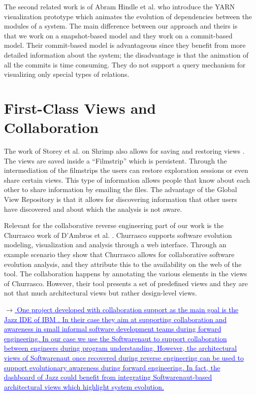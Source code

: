 \documentclass[preprint,12pt]{elsarticle}
\newcommand{\ra}{$\rightarrow$}
\newcommand{\chg}[2]{\textcolor{red}{\sout{#1}}{\ra}\textcolor{blue}{\uline{#2}}} %
\begin{document}
The second related work is of Abram Hindle et al. \cite{hindle-yarn} who introduce the YARN visualization prototype which animates the evolution of dependencies between the modules of a system. The main difference between our approach and theirs is that we work on a snapshot-based model and they work on a commit-based model. Their commit-based model is advantageous since they benefit from more detailed information about the system; the disadvantage is that the animation of all the commits is time consuming. They do not support a query mechanism for visualizing only special types of relations.


\section {First-Class Views and Collaboration} 

The work of Storey et al. on Shrimp also allows for saving and restoring views \cite{rayside-flow}. The views are saved inside a ``Filmstrip'' which is persistent. Through the intermediation of the filmstrips the users can restore exploration sessions or even share certain views. This type of information allows people that know about each other to share information by emailing the files. The advantage of the Global View Repository is that it allows for discovering information that other users have discovered and about which the analysis is not aware. 


Relevant for the collaborative reverse engineering part of our work is the Churrasco work of D’Ambros et al. \cite{dambros-churrasco}. Churrasco supports software evolution modeling, visualization and analysis through a web interface. 
Through an example scenario they show that Churrasco allows for collaborative software evolution analysis, and they attribute this to the availability on the web of the tool. The collaboration happens by annotating the various elements in the views of Churrasco. However, their tool presents a set of predefined views and they are not that much architectural views but rather design-level views. 

\chg{}{
One project developed with collaboration support as the main goal is the Jazz IDE of IBM \cite{hupfer-jazz}. 
In their case they aim at supporting collaboration and awareness in small informal software development teams during forward engineering. In our case we use the Softwarenaut to support collaboration between engineers during program understanding. However, the architectural views of Softwarenaut once recovered during reverse engineering can be used to support evolutionary awareness during forward engineering. In fact, the dashboard of Jazz could benefit from integrating Softwarenaut-based architectural views which highlight system evolution.
}
\end{document}
